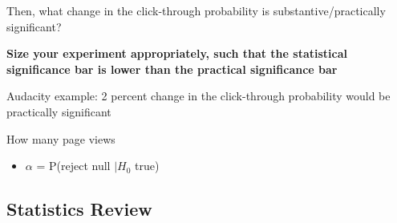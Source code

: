 \documentclass[10pt]{article}
\theoremstyle{definition}
\begin{document}
Then, what change in the click-through probability is substantive/practically significant?

\textbf{Size your experiment appropriately, such that the statistical significance bar is lower than the practical significance bar}

Audacity example: 2 percent change in the click-through probability would be practically significant

How many page views \\
\begin{itemize}
    \item $\alpha$ = P(reject null $| H_{0}$ true)
\end{itemize}
\subsection{Statistics Review}
\end{document}
